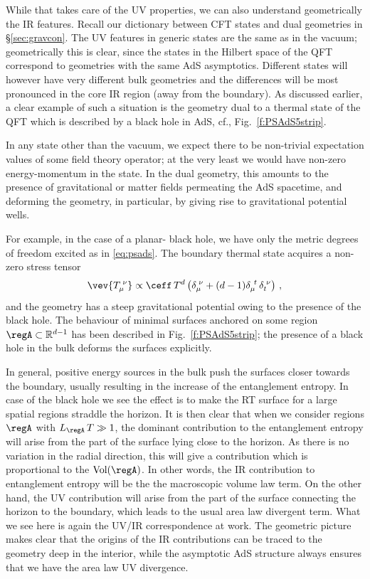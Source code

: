 \documentclass[12pt,openany]{book}
\begin{document}
While that takes care of the UV properties, we can also understand geometrically the IR features. Recall our  dictionary between CFT states and dual geometries in \S\ref{sec:gravcon}. The UV features in generic states are the same as in the vacuum; geometrically this is clear, since the states in the Hilbert space of the QFT correspond to geometries with the same AdS asymptotics. Different states will however have very different bulk geometries and the differences will be most pronounced in the core  IR region (away from the boundary). As discussed earlier, a clear example of such a situation is the geometry dual to a thermal state of the QFT which is described by a black hole in AdS,  cf., Fig.~\ref{f:PSAdS5strip}.

In any state other than the vacuum, we expect there to be non-trivial expectation values of some field theory operator; at the very least we would have non-zero energy-momentum in the state. In the dual geometry, this amounts to the presence of gravitational or matter fields permeating the AdS spacetime, and deforming the geometry, in particular, by giving rise to gravitational potential wells.

For example, in the case of a planar- black hole, we have only the metric degrees of freedom excited as in \eqref{eq:psads}. The boundary thermal state acquires a non-zero stress tensor
%
\begin{equation}
\vev{T_\mu^{\;\nu}} \propto \ceff \, T^d \left(\delta_\mu^{\;\nu} + (d-1) \delta_\mu^{\ t}\, \delta_t^{\;\nu}\right) \,,
\label{}
\end{equation}
%
and the geometry has a steep gravitational potential owing to the presence of the black hole. The behaviour of minimal surfaces anchored on some region $\regA \subset {\mathbb R}^{d-1}$ has been described in Fig.~\ref{f:PSAdS5strip}; the presence of a black hole in the bulk deforms the  surfaces explicitly.

 In general, positive energy sources in the bulk push the surfaces closer towards the boundary,  usually resulting in the increase of the entanglement entropy. In case of the black hole we see the  effect is to make the RT surface for a large spatial regions  straddle the horizon. It is then clear that when we consider regions $\regA$ with $L_\regA \, T \gg 1$,  the dominant contribution to the entanglement entropy will arise from the part of the surface lying close to the horizon. As there is no variation in the radial direction, this will give a contribution which is proportional to the $\text{Vol}(\regA)$. In other words, the IR contribution to entanglement entropy will be the the macroscopic volume law term. On  the  other hand, the UV contribution will arise from the part of the surface connecting the horizon to the boundary, which leads to the usual area law divergent term. What we see here is again the UV/IR correspondence at work. The geometric picture makes clear that the origins of the IR contributions can be traced to the geometry deep in the interior, while the asymptotic AdS structure always ensures that we have the area law UV divergence.
\end{document}

